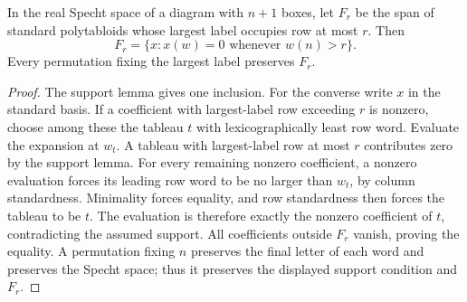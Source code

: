 \begin{lemma}
\label{lem:specht-last-row-filtration}
\leanok
In the real Specht space of a diagram with $n+1$ boxes, let $F_r$
be the span of standard polytabloids whose largest label occupies
row at most $r$. Then
\[
 F_r=\{x:x(w)=0\text{ whenever }w(n)>r\}.
\]
Every permutation fixing the largest label preserves $F_r$.
\end{lemma}
\begin{proof}
The support lemma gives one inclusion. For the converse write $x$
in the standard basis. If a coefficient with largest-label row
exceeding $r$ is nonzero, choose among these the tableau $t$ with
lexicographically least row word. Evaluate the expansion at $w_t$.
A tableau with largest-label row at most $r$ contributes zero by
the support lemma. For every remaining nonzero coefficient, a
nonzero evaluation forces its leading row word to be no larger
than $w_t$, by column standardness. Minimality forces equality,
and row standardness then forces the tableau to be $t$.
The evaluation is therefore exactly the nonzero coefficient of $t$,
contradicting the assumed support. All coefficients outside $F_r$
vanish, proving the equality. A permutation fixing $n$ preserves
the final letter of each word and preserves the Specht space;
thus it preserves the displayed support condition and $F_r$.
\end{proof}


